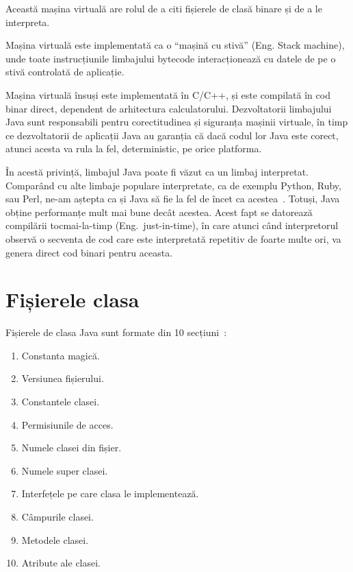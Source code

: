 Această mașina virtuală are rolul de a citi fișierele de clasă binare și
de a le interpreta.

Mașina virtuală este implementată ca o ``mașină cu stivă'' (Eng. Stack
machine), unde toate instrucțiunile limbajului bytecode interacționează
cu datele de pe o stivă controlată de aplicație.

Mașina virtuală însuși este implementată în C/C++, și este compilată în
cod binar direct, dependent de arhitectura calculatorului. Dezvoltatorii limbajului
Java sunt responsabili pentru corectitudinea și siguranța mașinii
virtuale, în timp ce dezvoltatorii de aplicații Java au garanția că dacă
codul lor Java este corect, atunci acesta va rula la fel, deterministic,
pe orice platforma.

În acestă privință, limbajul Java poate fi văzut ca un limbaj interpretat.
Comparând cu alte limbaje populare interpretate, ca de exemplu Python,
Ruby, sau Perl, ne-am aștepta ca și Java să fie la fel de încet ca
acestea~\cite{language_benchmarks}.
Totuși, Java obține performanțe mult mai bune decât
acestea. Acest fapt se datorează compilării tocmai-la-timp (Eng.\
just-in-time), în care atunci când interpretorul observă o secventa de
cod care este interpretată repetitiv de foarte multe ori, va genera
direct cod binari pentru aceasta.


\section{Fișierele clasa}

Fișierele de clasa Java sunt formate din 10
secțiuni~\cite{classfile_sections}:

\begin{enumerate}
	\item
	      Constanta magică.
	\item
	      Versiunea fișierului.
	\item
	      Constantele clasei.
	\item
	      Permisiunile de acces.
	\item
	      Numele clasei din fișier.
	\item
	      Numele super clasei.
	\item
	      Interfețele pe care clasa le implementează.
	\item
	      Câmpurile clasei.
	\item
	      Metodele clasei.
	\item
	      Atribute ale clasei.
\end{enumerate}

